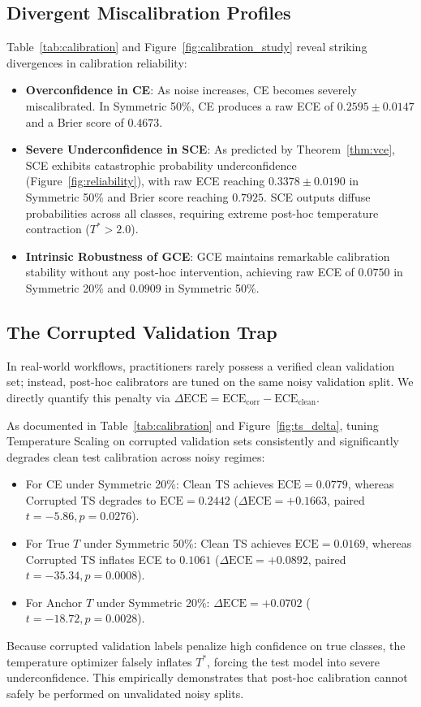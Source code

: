 \documentclass[journal]{IEEEtran}
\theoremstyle{definition}
\begin{document}
\subsection{Divergent Miscalibration Profiles}
Table~\ref{tab:calibration} and Figure~\ref{fig:calibration_study} reveal striking divergences in calibration reliability:
\begin{itemize}
    \item \textbf{Overconfidence in CE}: As noise increases, CE becomes severely miscalibrated. In Symmetric 50\%, CE produces a raw ECE of $0.2595 \pm 0.0147$ and a Brier score of $0.4673$.
    \item \textbf{Severe Underconfidence in SCE}: As predicted by Theorem~\ref{thm:vce}, SCE exhibits catastrophic probability underconfidence (Figure~\ref{fig:reliability}), with raw ECE reaching $0.3378 \pm 0.0190$ in Symmetric 50\% and Brier score reaching $0.7925$. SCE outputs diffuse probabilities across all classes, requiring extreme post-hoc temperature contraction ($T^* > 2.0$).
    \item \textbf{Intrinsic Robustness of GCE}: GCE maintains remarkable calibration stability without any post-hoc intervention, achieving raw ECE of $0.0750$ in Symmetric 20\% and $0.0909$ in Symmetric 50\%.
\end{itemize}

\subsection{The Corrupted Validation Trap}
In real-world workflows, practitioners rarely possess a verified clean validation set; instead, post-hoc calibrators are tuned on the same noisy validation split. We directly quantify this penalty via $\Delta \text{ECE} = \text{ECE}_{\text{corr}} - \text{ECE}_{\text{clean}}$.

As documented in Table~\ref{tab:calibration} and Figure~\ref{fig:ts_delta}, tuning Temperature Scaling on corrupted validation sets consistently and significantly degrades clean test calibration across noisy regimes:
\begin{itemize}
    \item For CE under Symmetric 20\%: Clean TS achieves $\text{ECE} = 0.0779$, whereas Corrupted TS degrades to $\text{ECE} = 0.2442$ ($\Delta \text{ECE} = +0.1663$, paired $t = -5.86, p = 0.0276$).
    \item For True $T$ under Symmetric 50\%: Clean TS achieves $\text{ECE} = 0.0169$, whereas Corrupted TS inflates ECE to $0.1061$ ($\Delta \text{ECE} = +0.0892$, paired $t = -35.34, p = 0.0008$).
    \item For Anchor $T$ under Symmetric 20\%: $\Delta \text{ECE} = +0.0702$ ($t = -18.72, p = 0.0028$).
\end{itemize}
Because corrupted validation labels penalize high confidence on true classes, the temperature optimizer falsely inflates $T^*$, forcing the test model into severe underconfidence. This empirically demonstrates that post-hoc calibration cannot safely be performed on unvalidated noisy splits.
\end{document}
